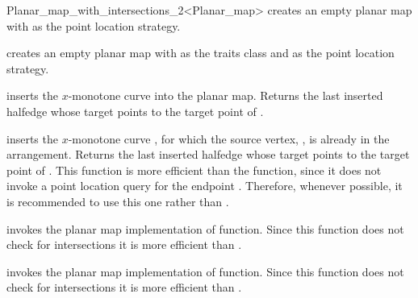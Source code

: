 \begin{ccRefClass}{Planar_map_with_intersections_2<Planar_map>}
    {creates an empty planar map with  as the point location strategy.}

    {creates an empty planar map with  as the traits class and  as the point location strategy.}

\ccOperations


      {inserts the $x$-monotone curve  into the planar map.
      Returns the last inserted halfedge whose target points to the
      target point of .
       }

      {inserts  the $x$-monotone curve , for
       which the source vertex, , is already in the
       arrangement.
       Returns the last inserted halfedge whose target points to the
       target point of .
       This function is more efficient than the  function,
       since it does not invoke a point location query for the
       endpoint . Therefore,
       whenever possible, it is recommended to use this one rather
       than .
       }

\begin{ccAdvanced}

  {invokes the planar map implementation of 
  function. Since this function does not check for intersections it is
  more efficient than .
   }

  {invokes the planar map implementation of
   function. Since this function does not
  check for intersections it is more efficient than .
       }


\end{ccAdvanced}
\end{ccRefClass}

